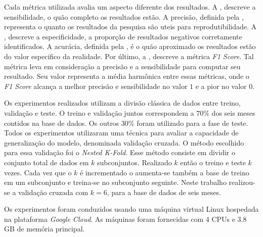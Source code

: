 




Cada métrica utilizada avalia um aspecto diferente dos resultados. A , descreve a sensibilidade, o quão completo os resultados estão. A precisão, definida pela , representa o quanto os resultados da pesquisa são uteis para reprodutibilidade. A , descreve a especificidade, a proporção de resultados negativos corretamente identificados. A acurácia, definida pela , é o quão aproximado os resultados estão do valor especifico da realidade. Por último, a , descreve a métrica \textit{F1 Score}. Tal métrica leva em consideração a precisão e a sensibilidade para computar seu resultado. Seu valor representa a média harmônica entre essas métricas, onde o \textit{F1 Score} alcança a melhor precisão e sensibilidade no valor $1$ e a pior no valor $0$.

Os experimentos realizados utilizam a divisão clássica de dados entre treino, validação e teste. O treino e validação juntos correspondem a $70\%$ dos seis meses contidos na base de dados. Os outros $30\%$ foram utilizado para a fase de teste. Todos os experimentos utilizaram uma técnica para avaliar a capacidade de generalização do modelo, denominada validação cruzada. O método escolhido para essa validação foi o \emph{Nested K-Fold}. Esse método consiste em dividir o conjunto total de dados em $k$ subconjuntos. Realizado $k$ então o treino e teste $k$ vezes. Cada vez que o $k$ 
é incrementado o aumenta-se também a base de treino em um subconjunto e treina-se no subconjunto seguinte. Neste trabalho realizou-se a validação cruzada com $k=6$, para a base de dados de seis meses.

Os experimentos foram conduzidos usando uma máquina virtual Linux hospedada na plataforma \textit{Google Cloud}. As máquinas foram fornecidas com 4 CPUs e 3.8 GB de memória principal.

